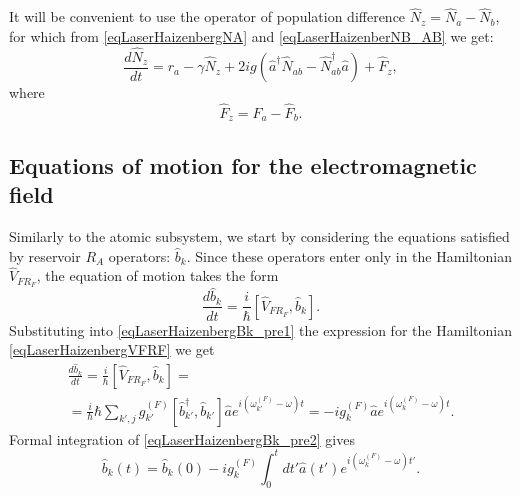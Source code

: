 It will be convenient to use the operator of population difference
$\hat{N}_z = \hat{N}_a - \hat{N}_b$, for which from
\eqref{eqLaserHaizenbergNA} and 
\eqref{eqLaserHaizenberNB_AB} we get:
\begin{equation}
\frac{d \hat{N}_z}{d t} = r_a
- \gamma \hat{N}_{z} +
2 i g 
 \left(
\hat{a}^{\dag}\hat{N}_{ab} -
\hat{N}_{ab}^{\dag}\hat{a}
\right) + \hat{F}_{z},
\label{eqLaserHaizenberNZ}
\end{equation}
where
\begin{equation}
\hat{F}_{z} = \hat{F}_{a} - \hat{F}_{b}.
\label{eqLaserHaizenberFZ}
\end{equation}

\subsection{Equations of motion for the electromagnetic field}

Similarly to the atomic subsystem, we start by considering the equations satisfied by reservoir $R_A$ operators:
$\hat{b}_k$. Since these operators enter only in
the Hamiltonian $\hat{V}_{FR_F}$, the equation of motion takes the form
\begin{equation}
\frac{d \hat{b}_k}{d t} = \frac{i}{\hbar}\left[\hat{V}_{FR_F}, \hat{b}_k
\right].
\label{eqLaserHaizenbergBk_pre1}
\end{equation}
Substituting into \eqref{eqLaserHaizenbergBk_pre1} the expression for
the Hamiltonian \eqref{eqLaserHaizenbergVFRF} we get
\begin{eqnarray}
\frac{d \hat{b}_k}{d t} = \frac{i}{\hbar}\left[\hat{V}_{FR_F}, \hat{b}_k
\right] = 
\nonumber \\
= \frac{i}{\hbar} \hbar 
\sum_{k',j} 
g_{k'}^{(F)}\left[\hat{b}_{k'}^{\dag},
  \hat{b}_{k'}\right]\hat{a}e^{i\left(\omega_{k'}^{(F)} - \omega\right)t} = 
-i g_{k}^{(F)}\hat{a}e^{i\left(\omega_{k}^{(F)} - \omega\right)t}.
\label{eqLaserHaizenbergBk_pre2}
\end{eqnarray}
Formal integration of \eqref{eqLaserHaizenbergBk_pre2} gives
\begin{equation}
\hat{b}_k\left(t\right) = 
\hat{b}_k\left(0\right) 
-i g_{k}^{(F)}\int_0^t d
t'\hat{a}\left(t'\right)e^{i\left(\omega_{k}^{(F)} - \omega\right)t'}.
\label{eqLaserHaizenbergBk}
\end{equation}

